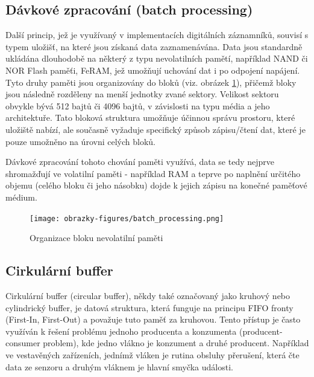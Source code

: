 \subsection{Dávkové zpracování (batch processing)}
\label{davkove_zpracovani}
Další princip, jež je využívaný v implementacích digitálních záznamníků, souvisí s typem uložišť, na které jsou získaná data zaznamenávána. Data jsou standardně ukládána dlouhodobě na některý z typu nevolatilních pamětí, například NAND či NOR Flash paměťi, FeRAM, jež umožňují uchování dat i po odpojení napájení. Tyto druhy paměti jsou organizovány do bloků (viz. obrázek \ref{fig:batch-processing}), přičemž bloky jsou následně rozděleny na menší jednotky zvané sektory. Velikost sektoru obvykle bývá 512 bajtů či 4096 bajtů, v závislosti na typu média a jeho architektuře. Tato bloková struktura umožňuje účinnou správu prostoru, které uložiště nabízí, ale současně vyžaduje specifický způsob zápisu/čtení dat, které je pouze umožněno na úrovni celých bloků. \cite{tech_target_nand_flash, non_volatile_memories}

Dávkové zpracování tohoto chování paměti využívá, data se tedy nejprve shromažďují ve volatilní paměti - například RAM a teprve po naplnění určitého objemu (celého bloku či jeho násobku) dojde k jejich zápisu na konečné paměťové médium.

\begin{figure}[h]
    \centering
    \texttt{[image: obrazky-figures/batch\_processing.png]}
    
    \caption{Organizace bloku nevolatilní paměti \cite{ieee_relationships_among_region_segment_frame_and_cluster}}
    \label{fig:batch-processing}
\end{figure}

\newpage

\subsection{Cirkulární buffer}
Cirkulární buffer (circular buffer), někdy také označovaný jako kruhový nebo cylindrický buffer, je datová struktura, která funguje na principu FIFO fronty (First-In, First-Out) a považuje tuto paměť za kruhovou. Tento přístup je často využíván k řešení problému jednoho producenta a konzumenta (producent-consumer problem), kde jedno vlákno je konzument a druhé producent. Například ve vestavěných zařízeních, jednímž vláken je rutina obsluhy přerušení, která čte data ze senzoru a druhým vláknem je hlavní smyčka události. \cite{embedjournal_ring_buffer}


